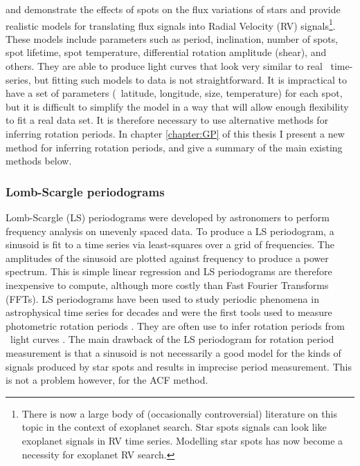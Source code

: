 \citet{Aigrain2012} and \citet{Dumusque2014} demonstrate the effects of spots
on the flux variations of stars and provide realistic models for translating
flux signals into Radial Velocity (RV) signals\footnote{There is now a large
body of (occasionally controversial) literature on this topic in the context
of exoplanet search.
Star spots signals can look like exoplanet signals in RV time series.
Modelling star spots has now become a necessity for exoplanet RV search.}.
These models include parameters such as period, inclination, number of spots,
spot lifetime, spot temperature, differential rotation amplitude (shear), and
others.
They are able to produce light curves that look very similar to real \kepler\
time-series, but fitting such models to data is not straightforward.
It is impractical to have a set of parameters (\eg\ latitude, longitude, size,
temperature) for each spot, but it is difficult to simplify the model in a
way that will allow enough flexibility to fit a real data set.
It is therefore necessary to use alternative methods for inferring rotation
periods.
In chapter \ref{chapter:GP} of this thesis I present a new method for
inferring rotation periods, and give a summary of the main existing methods
below.

\subsubsection{Lomb-Scargle periodograms}
Lomb-Scargle (LS) periodograms \citep{Lomb1976, Scargle1982} were developed
by astronomers to perform frequency analysis on unevenly spaced data.
To produce a LS periodogram, a sinusoid is fit to a time series via
least-squares over a grid of frequencies.
The amplitudes of the sinusoid are plotted against frequency to produce a
power spectrum.
This is simple linear regression and LS periodograms are therefore
inexpensive to compute, although more costly than Fast Fourier Transforms
(FFTs).
LS periodograms have been used to study periodic phenomena in astrophysical
time series for decades and were the first tools used to measure photometric
rotation periods \citep[\eg][]{Scott1992, Mottola1995}.
They are often use to infer rotation periods from \kepler\ light curves
\citep[\eg][]{Reinhold2013, Reinhold2013b}.
The main drawback of the LS periodogram for rotation period measurement is
that a sinusoid is not necessarily a good model for the kinds of signals
produced by star spots and results in imprecise period measurement.
This is not a problem however, for the ACF method.

